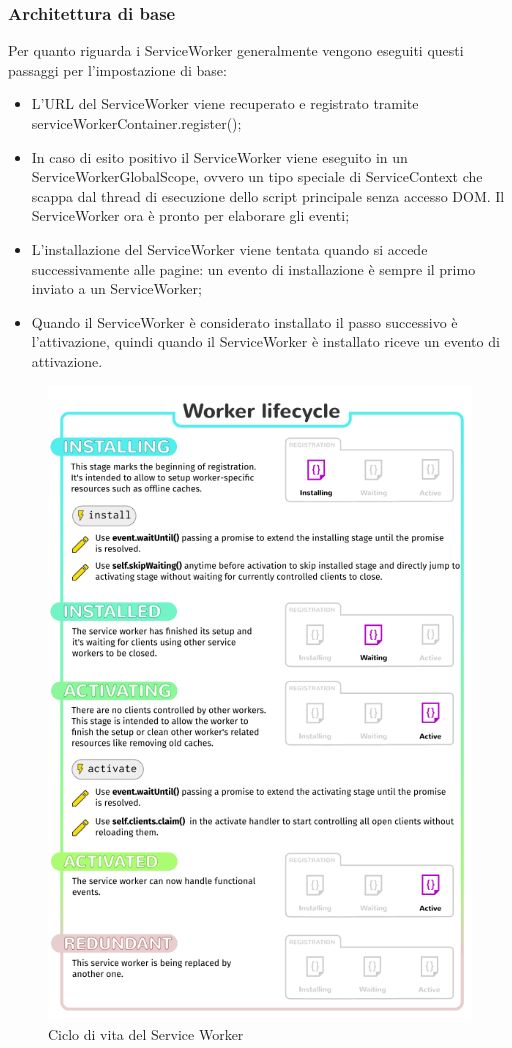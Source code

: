 \documentclass[11pt ,a4paper , twoside , openright ]{article}
\begin{document}
\subsubsection{Architettura di base}
Per quanto riguarda i ServiceWorker generalmente vengono eseguiti questi passaggi per l'impostazione di base:
\begin{itemize}
	\item L'URL del ServiceWorker viene recuperato e registrato tramite serviceWorkerContainer.register();
	\item In caso di esito positivo il ServiceWorker viene eseguito in un ServiceWorkerGlobalScope, ovvero un tipo speciale di ServiceContext che scappa dal thread di esecuzione dello script principale senza accesso DOM. Il ServiceWorker ora è pronto per elaborare gli eventi;
	\item L'installazione del ServiceWorker viene tentata quando si accede successivamente alle pagine: un evento di installazione è sempre il primo inviato a un ServiceWorker;
	\item Quando il ServiceWorker è considerato installato il passo successivo è l'attivazione, quindi quando il ServiceWorker è installato riceve un evento di attivazione.
\end{itemize}
\begin{figure}[h]
	\centering
	\includegraphics[width=0.6\linewidth]{SwLifecycle}
	\caption{Ciclo di vita del Service Worker}
	\label{fig:Ciclo di vita del Service Worker}
\end{figure}
\end{document}
